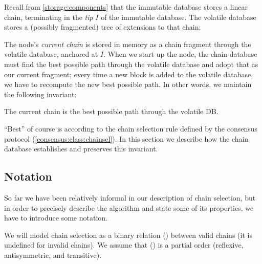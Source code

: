 Recall from \cref{storage:components} that the immutable database stores a
linear chain, terminating in the \emph{tip} $I$ of the immutable database. The
volatile database stores a (possibly fragmented) tree of extensions to that
chain:
%
\begin{center}
\end{center}
%
The node's \emph{current chain} is stored in memory as a chain fragment through
the volatile database, anchored at $I$.  When we start up the node, the chain
database must find the best possible path through the volatile database and
adopt that as our current fragment; every time a new block is added to the
volatile database, we have to recompute the new best possible path. In other
words, we maintain the following invariant:

\begin{definition}
\label{current-chain-invariant}
The current chain is the best possible path through the volatile DB.
\end{definition}

``Best'' of course is according to the chain selection rule defined by the
consensus protocol (\cref{consensus:class:chainsel}). In this section we
describe how the chain database establishes and preserves this invariant.

\subsection{Notation}

So far we have been relatively informal in our description of chain selection,
but in order to precisely describe the algorithm and state some of its
properties, we have to introduce some notation.

\begin{definition}
We will model chain selection as a binary relation (\chainlt) between valid
chains (it is undefined for invalid chains). We assume that (\chainle) is a
partial order (reflexive, antisymmetric, and transitive).
\end{definition}

